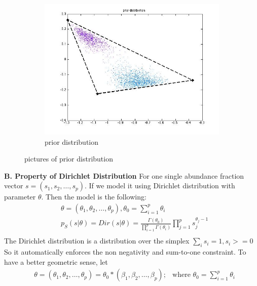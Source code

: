\documentclass[14pt]{book}
\begin{document}
\begin{figure}
        \centering
        \begin{subfigure}[b]{0.5\textwidth}
                \centering
                \includegraphics[width=\textwidth]{prior1.jpg}
                \caption{prior distribution }
                \label{fig:prior}
        \end{subfigure}%

        \caption{pictures of prior distribution }\label{fig:prior}
\end{figure}
{\bf B. Property of Dirichlet Distribution }  
For one single abundance fraction vector $s = (s_1,s_2,\dots, s_p)$. If we model it using Dirichlet distribution with parameter $\theta$. Then the model is the following:
\begin{equation}
\begin{aligned}
& \theta = (\theta_1,\theta_2,\dots,\theta_p), \theta_0=\sum_{i=1}^p \theta_i\\
& p_S(s|\theta ) = Dir(s|\theta) = \frac{\Gamma (\theta_0)}{\prod_{i=1}^p \Gamma(\theta_i) }\prod_{j=1}^p s_j^{\theta_j-1}\\
\end{aligned}
\end{equation}
The Dirichlet distribution is a distribution over the simplex $\sum_i s_i=1,s_i>=0$ So it automatically enforces the non negativity and sum-to-one constraint. To have a better geometric sense, let
\begin{equation}
\begin{aligned}
& \theta = (\theta_1,\theta_2,\dots,\theta_p) = \theta_0*(\beta_1,\beta_2,\dots,\beta_p); 
& \text{where } \theta_0=\sum_{i=1}^p \theta_i\\
\end{aligned}
\end{equation}
\end{document}
